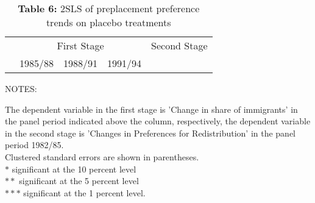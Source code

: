 \documentclass[12pt,a4paper]{standalone}
\newcommand\tab[1][1cm]{\hspace*{#1}}
\newcommand\tabs[1][0.8cm]{\hspace*{#1}}
\newcommand\tabu[1][0.4cm]{\hspace*{#1}}
\begin{document}
\begin{minipage}[c][15cm]{1.3 \textwidth}

\thispagestyle{empty}

\begin{table}
\centering
\caption*{\textbf{Table 6:} 2SLS of preplacement preference trends on placebo treatments}

\begin{threeparttable}
\begin{tabular}{lllll}

    \toprule
    & \multicolumn{3}{c}{First Stage} & 						Second Stage\\
    \cmidrule(lr){2-4}
    \cmidrule(lr){5-5}
    & 1985/88 & 1988/91 & 1991/94 & \\ 
    \midrule
 

    \bottomrule
\end{tabular}

    \begin{tablenotes}
    \item NOTES:
	\par
	\begingroup
	\leftskip=0.3cm %
	\noindent 
	The dependent variable in the first stage is 				'Change in share of immigrants' in the panel period 		indicated above the column, respectively, the 				dependent variable in the second stage is 'Changes 			in Preferences for Redistribution' in the panel 			period 1982/85. \\
    Clustered standard errors are shown in parentheses. \\
    $ \ast $ \tab significant at the 10 percent level \\
    $ \ast \ast $ \tabs significant at the 5 percent level 	\\
    $ \ast \ast \ast $ \tabu significant at the 1 percent 		level.
	\par
	\endgroup




    \end{tablenotes}
\end{threeparttable}
\end{table}

\end{minipage}
\end{document}
